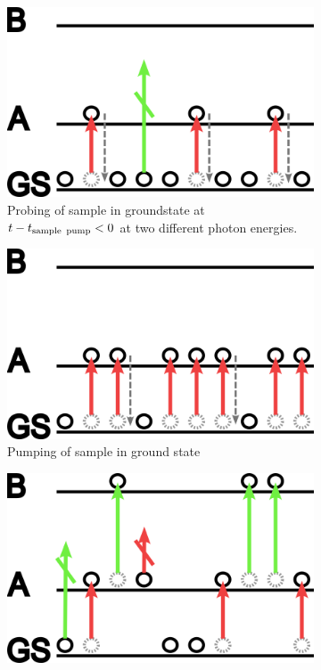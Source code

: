 \documentclass[twoside,openright,listof=numbered]{scrreprt}
\begin{document}
\begin{figure}[hbtp]
\centering
\begin{subfigure}[t]{0.3\textwidth}
\centering
\includegraphics[width=\linewidth]{images/TA-explanationProbeOnly.png}
\caption{Probing of sample in groundstate at $t-t_\text{sample\, pump} < 0$ at two different photon energies.\label{fig:probeOnly}}
\end{subfigure}
\hfill
\begin{subfigure}[t]{0.3\textwidth}
\centering
\includegraphics[width=\linewidth]{images/TA-explanationPumpOnly.png}
\caption{Pumping of sample in ground state}
\end{subfigure}
\hfill
\begin{subfigure}[t]{0.3\textwidth}
\centering
\includegraphics[width=\linewidth]{images/TA-explanation-probe-after-pump.png}

\end{subfigure}
\end{figure}
\end{document}
